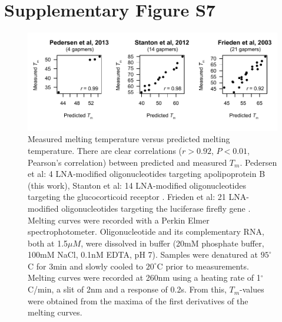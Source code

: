 \documentclass[a4paper,11pt]{article}
\newenvironment{Ncenter}{%
  \setlength\topsep{-10pt}
  \setlength\parskip{-100pt}
  \begin{center}
}{%
  \end{center}
}
\begin{document}
\section{Supplementary Figure S7}
\begin{figure}[!h]
\begin{Ncenter}
\includegraphics[width=\textwidth]{SuppFigS3.pdf}
\end{Ncenter}
\caption{Measured melting temperature versus predicted melting temperature. There are clear correlations ($r > 0.92$, $P < 0.01$, Pearson's correlation) between predicted and measured $T_m$. Pedersen et al: 4 LNA-modified oligonucleotides targeting apolipoprotein B (this work), Stanton et al: 14 LNA-modified oligonucleotides targeting the glucocorticoid receptor \cite{Stanton:2012fu}. Frieden et al: 21 LNA-modified oligonucleotides targeting the luciferase firefly gene \cite{Frieden:2003er}. Melting curves were recorded with a Perkin Elmer spectrophotometer. Oligonucleotide and its complementary RNA, both at 1.5$\mu M$, were dissolved in buffer (20mM phosphate buffer, 100mM NaCl, 0.1nM EDTA, pH 7). Samples were denatured at $95^\circ$C for 3min and slowly cooled to $20^\circ$C prior to measurements. Melting curves were recorded at 260nm using a heating rate of 1$^\circ$C/min, a slit of 2nm and a response of 0.2s. From this, $T_m$-values were obtained from the maxima of the first derivatives of the melting curves.}\label{fig:figTm}
\end{figure}

\newpage

\end{document}
